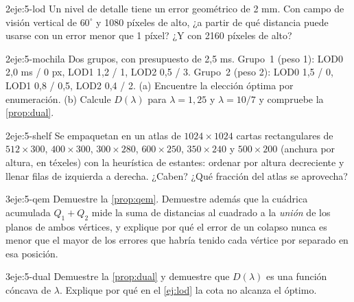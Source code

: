 \begin{ejercicio}{2}{eje:5-lod}
Un nivel de detalle tiene un error geométrico de 2 mm. Con campo de visión vertical de $60^\circ$ y 1080 píxeles de alto, ¿a partir de qué distancia puede usarse con un error menor que 1 píxel? ¿Y con 2160 píxeles de alto?
\end{ejercicio}

\begin{ejercicio}{2}{eje:5-mochila}
Dos grupos, con presupuesto de 2,5 ms. Grupo~1 (peso 1): LOD0 2,0 ms / 0 px, LOD1 1,2 / 1, LOD2 0,5 / 3. Grupo~2 (peso 2): LOD0 1,5 / 0, LOD1 0,8 / 0,5, LOD2 0,4 / 2. (a) Encuentre la elección óptima por enumeración. (b) Calcule $D(\lambda)$ para $\lambda=1{,}25$ y $\lambda=10/7$ y compruebe la \cref{prop:dual}.
\end{ejercicio}

\begin{ejercicio}{2}{eje:5-shelf}
Se empaquetan en un atlas de $1024\times 1024$ cartas rectangulares de $512\times 300$, $400\times 300$, $300\times 280$, $600\times 250$, $350\times 240$ y $500\times 200$ (anchura por altura, en téxeles) con la heurística de estantes: ordenar por altura decreciente y llenar filas de izquierda a derecha. ¿Caben? ¿Qué fracción del atlas se aprovecha?
\end{ejercicio}

\begin{ejercicio}{3}{eje:5-qem}
Demuestre la \cref{prop:qem}. Demuestre además que la cuádrica acumulada $Q_1+Q_2$ mide la suma de distancias al cuadrado a la \emph{unión} de los planos de ambos vértices, y explique por qué el error de un colapso nunca es menor que el mayor de los errores que habría tenido cada vértice por separado en esa posición.
\end{ejercicio}

\begin{ejercicio}{3}{eje:5-dual}
Demuestre la \cref{prop:dual} y demuestre que $D(\lambda)$ es una función cóncava de $\lambda$. Explique por qué en el \cref{ej:lod} la cota no alcanza el óptimo.
\end{ejercicio}
